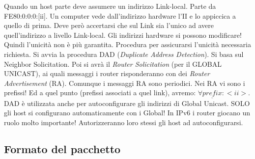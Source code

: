 Quando un host parte deve assumere un indirizzo Link-local. Parte da FE80:0:0:0:[ii]. Un computer vede dall'indirizzo hardware l'II e lo appiccica a quello di prima. Deve però accertarsi che sul Link sia l'unico ad avere quell'indirizzo a livello Link-local. Gli indirizzi hardware si possono modificare! Quindi l'unicità non è più garantita. Procedura per assicurarsi l'unicità necessaria richiesta. Si avvia la procedura DAD (\textit{Duplicate Address Detection}). Si basa sul Neighbor Solicitation. Poi si avrà il \textit{Router Solicitation} (per il GLOBAL UNICAST), ai quali messaggi i router risponderanno con dei \textit{Router Advertisement} (RA). Comunque i messaggi RA sono periodici. Nei RA vi sono i prefissi! Ed a quel punto (prefissi associati a quel link), avremo: $\forall \underline{prefix}:<ii>$. DAD è utilizzata anche per autoconfigurare gli indirizzi di Global Unicast. SOLO gli host si configurano automaticamente con i Global! In IPv6 i router giocano un ruolo molto importante! Autorizzeranno loro stessi gli host ad autoconfigurarsi.

\subsection{Formato del pacchetto}

